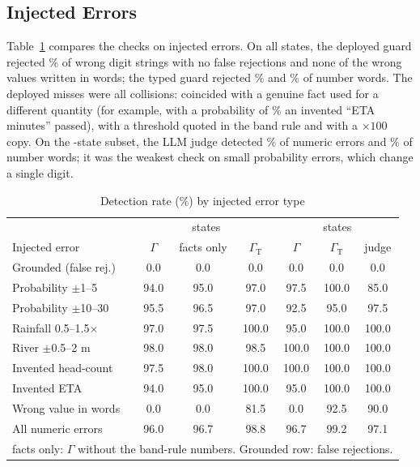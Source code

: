 \documentclass[conference]{IEEEtran}
\begin{document}
\subsection{Injected Errors}
Table~\ref{tab:guard} compares the checks on injected errors. On all \GuardCtx{} states, the deployed guard rejected \GAllDeployed\% of wrong digit strings with no false rejections and none of the wrong values written in words; the typed guard rejected \GAllTyped\% and \GWordsTyped\% of number words. The \GMissN{} deployed misses were all collisions: \GMissFact{} coincided with a genuine fact used for a different quantity (for example, with a probability of \MissExProb\% an invented ``ETA \MissExEta{} minutes'' passed), \GMissRule{} with a threshold quoted in the band rule and \GMissScale{} with a $\times100$ copy. On the \JudgeInjStates-state subset, the LLM judge detected \JudgeInjNum\% of numeric errors and \JudgeInjWords\% of number words; it was the weakest check on small probability errors, which change a single digit.

\begin{table}[t]
\caption{Detection rate (\%) by injected error type}
\label{tab:guard}
\centering
\footnotesize
\setlength{\tabcolsep}{2.6pt}
\begin{tabular}{lccc|ccc}
\toprule
 & \multicolumn{3}{c|}{\GuardCtx{} states} & \multicolumn{3}{c}{\JudgeInjStates{} states}\\
Injected error & $\Gamma$ & facts only & $\Gamma_{\mathrm{T}}$ & $\Gamma$ & $\Gamma_{\mathrm{T}}$ & judge\\
\midrule
Grounded (false rej.) & 0.0 & 0.0 & 0.0 & 0.0 & 0.0 & 0.0\\
\midrule
Probability $\pm$1--5 & 94.0 & 95.0 & 97.0 & 97.5 & 100.0 & 85.0\\
Probability $\pm$10--30 & 95.5 & 96.5 & 97.0 & 92.5 & 95.0 & 97.5\\
Rainfall 0.5--1.5$\times$ & 97.0 & 97.5 & 100.0 & 95.0 & 100.0 & 100.0\\
River $\pm$0.5--2 m & 98.0 & 98.0 & 98.5 & 100.0 & 100.0 & 100.0\\
Invented head-count & 97.5 & 98.0 & 100.0 & 100.0 & 100.0 & 100.0\\
Invented ETA & 94.0 & 95.0 & 100.0 & 95.0 & 100.0 & 100.0\\
Wrong value in words & 0.0 & 0.0 & 81.5 & 0.0 & 92.5 & 90.0\\
\midrule
All numeric errors & 96.0 & 96.7 & 98.8 & 96.7 & 99.2 & 97.1\\
\bottomrule
\multicolumn{7}{l}{\scriptsize facts only: $\Gamma$ without the band-rule numbers. Grounded row: false rejections.}\\
\end{tabular}
\end{table}
\end{document}
